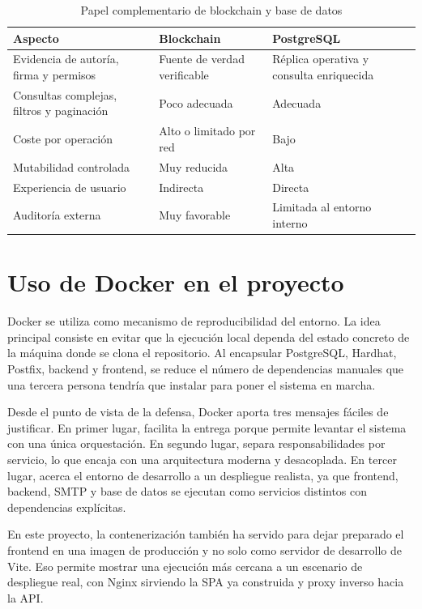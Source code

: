 \documentclass[11pt, a4paper]{article}
\begin{document}
\begin{table}[H]
    \centering
    \small
    \begin{tabular}{|p{5cm}|p{4.7cm}|p{4.7cm}|}
    \hline
    \textbf{Aspecto} & \textbf{Blockchain} & \textbf{PostgreSQL} \\
    \hline
    Evidencia de autoría, firma y permisos & Fuente de verdad verificable & Réplica operativa y consulta enriquecida \\
    \hline
    Consultas complejas, filtros y paginación & Poco adecuada & Adecuada \\
    \hline
    Coste por operación & Alto o limitado por red & Bajo \\
    \hline
    Mutabilidad controlada & Muy reducida & Alta \\
    \hline
    Experiencia de usuario & Indirecta & Directa \\
    \hline
    Auditoría externa & Muy favorable & Limitada al entorno interno \\
    \hline
    \end{tabular}
    \caption{Papel complementario de blockchain y base de datos}
    \label{tab:blockchain-bd}
\end{table}

\section{Uso de Docker en el proyecto}

Docker se utiliza como mecanismo de reproducibilidad del entorno. La idea principal consiste en evitar que la ejecución local dependa del estado concreto de la máquina donde se clona el repositorio. Al encapsular PostgreSQL, Hardhat, Postfix, backend y frontend, se reduce el número de dependencias manuales que una tercera persona tendría que instalar para poner el sistema en marcha.

Desde el punto de vista de la defensa, Docker aporta tres mensajes fáciles de justificar. En primer lugar, facilita la entrega porque permite levantar el sistema con una única orquestación. En segundo lugar, separa responsabilidades por servicio, lo que encaja con una arquitectura moderna y desacoplada. En tercer lugar, acerca el entorno de desarrollo a un despliegue realista, ya que frontend, backend, SMTP y base de datos se ejecutan como servicios distintos con dependencias explícitas.

En este proyecto, la contenerización también ha servido para dejar preparado el frontend en una imagen de producción y no solo como servidor de desarrollo de Vite. Eso permite mostrar una ejecución más cercana a un escenario de despliegue real, con Nginx sirviendo la SPA ya construida y proxy inverso hacia la API.
\end{document}
